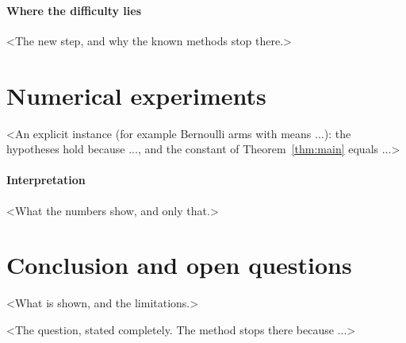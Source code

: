 \documentclass[11pt]{article}
\begin{document}
\paragraph{Where the difficulty lies} <The new step, and why the known methods stop there.>

\section{Numerical experiments}\label{sec:examples}

\begin{example}[<Name>]
<An explicit instance (for example Bernoulli arms with means ...): the hypotheses hold because ...,
and the constant of Theorem~\ref{thm:main} equals ...>
\end{example}

\paragraph{Interpretation} <What the numbers show, and only that.>

\section{Conclusion and open questions}\label{sec:open}

<What is shown, and the limitations.>

\begin{openquestion}\label{oq:example}
<The question, stated completely. The method stops there because ...>
\end{openquestion}
\end{document}
